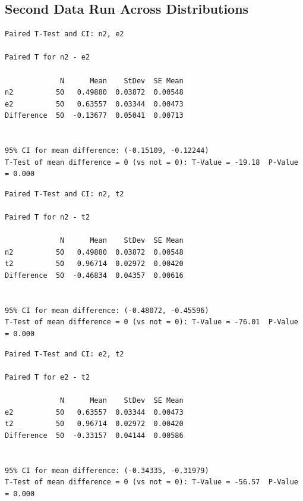 \documentclass[letterpaper,10pt]{article}
\begin{document}
\subsection{Second Data Run Across Distributions}
\begin{samepage}
\begin{verbatim}
Paired T-Test and CI: n2, e2 

Paired T for n2 - e2

             N      Mean    StDev  SE Mean
n2          50   0.49880  0.03872  0.00548
e2          50   0.63557  0.03344  0.00473
Difference  50  -0.13677  0.05041  0.00713


95% CI for mean difference: (-0.15109, -0.12244)
T-Test of mean difference = 0 (vs not = 0): T-Value = -19.18  P-Value = 0.000
\end{verbatim}
\end{samepage}
\begin{samepage}
\begin{verbatim}
Paired T-Test and CI: n2, t2 

Paired T for n2 - t2

             N      Mean    StDev  SE Mean
n2          50   0.49880  0.03872  0.00548
t2          50   0.96714  0.02972  0.00420
Difference  50  -0.46834  0.04357  0.00616


95% CI for mean difference: (-0.48072, -0.45596)
T-Test of mean difference = 0 (vs not = 0): T-Value = -76.01  P-Value = 0.000
\end{verbatim}
\end{samepage}
\begin{samepage}
\begin{verbatim}
Paired T-Test and CI: e2, t2 

Paired T for e2 - t2

             N      Mean    StDev  SE Mean
e2          50   0.63557  0.03344  0.00473
t2          50   0.96714  0.02972  0.00420
Difference  50  -0.33157  0.04144  0.00586


95% CI for mean difference: (-0.34335, -0.31979)
T-Test of mean difference = 0 (vs not = 0): T-Value = -56.57  P-Value = 0.000
\end{verbatim}
\end{samepage}
\end{document}
